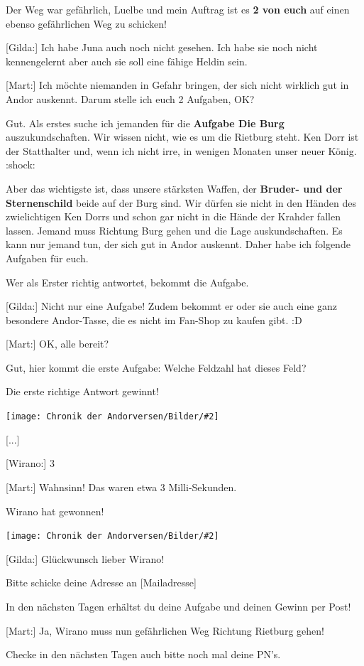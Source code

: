 \documentclass[10pt, a4paper, oneside]{book}
\newcommand{\bildmitts}[2][height=0.32\textwidth,width=0.48\textwidth,keepaspectratio]{%
    \begin{center}
        \texttt{[image: Chronik der Andorversen/Bilder/\#2]}
    \end{center}
}
\begin{document}
\begin{multicols}{2}
Der Weg war gefährlich, Luelbe und mein Auftrag ist es \textbf{2 von euch} auf einen ebenso gefährlichen Weg zu schicken!

[Gilda:] Ich habe Juna auch noch nicht gesehen. Ich habe sie noch nicht kennengelernt aber auch sie soll eine fähige Heldin sein.

[Mart:] Ich möchte niemanden in Gefahr bringen, der sich nicht wirklich gut in Andor auskennt. Darum stelle ich euch 2 Aufgaben, OK?

Gut. Als erstes suche ich jemanden für die \textbf{Aufgabe Die Burg} auszukundschaften. Wir wissen nicht, wie es um die Rietburg steht. Ken Dorr ist der Statthalter und, wenn ich nicht irre, in wenigen Monaten unser neuer König. :shock:

Aber das wichtigste ist, dass unsere stärksten Waffen, der \textbf{Bruder- und der Sternenschild} beide auf der Burg sind. Wir dürfen sie nicht in den Händen des zwielichtigen Ken Dorrs und schon gar nicht in die Hände der Krahder fallen lassen. Jemand muss Richtung Burg gehen und die Lage auskundschaften. Es kann nur jemand tun, der sich gut in Andor auskennt. Daher habe ich folgende Aufgaben für euch.

Wer als Erster richtig antwortet, bekommt die Aufgabe.

[Gilda:] Nicht nur eine Aufgabe! Zudem bekommt er oder sie auch eine ganz besondere Andor-Tasse, die es nicht im Fan-Shop zu kaufen gibt. :D

[Mart:] OK, alle bereit?

Gut, hier kommt die erste Aufgabe: Welche Feldzahl hat dieses Feld?

Die erste richtige Antwort gewinnt!

\bildmitts{AA2016 Treffen mit Mart und Juna 5.jpeg}

[...]

[Wirano:] 3

[Mart:] Wahnsinn! Das waren etwa 3 Milli-Sekunden.

Wirano hat gewonnen!

\bildmitts{AA2016 Treffen mit Mart und Juna 6.jpeg}

[Gilda:] Glückwunsch lieber Wirano!

Bitte schicke deine Adresse an [Mailadresse]

In den nächsten Tagen erhältst du deine Aufgabe und deinen Gewinn per Post!

[Mart:] Ja, Wirano muss nun gefährlichen Weg Richtung Rietburg gehen!

Checke in den nächsten Tagen auch bitte noch mal deine PN's.


\end{multicols}
\end{document}
